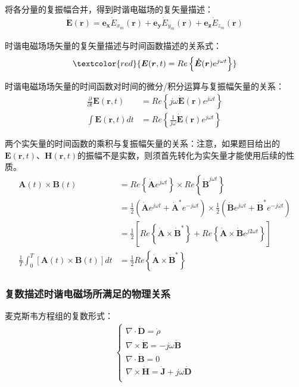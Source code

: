 \documentclass[withoutpreface,bwprint]{cumcmthesis} %
\begin{document}
将各分量的复振幅合并，得到时谐电磁场的复矢量描述：
\begin{align}
    \boldsymbol{\dot{E}}(\boldsymbol{r}) = \boldsymbol{e_x}\dot{E}_{x_m}(\boldsymbol{r}) + \boldsymbol{e_y}\dot{E}_{y_m}(\boldsymbol{r}) + \boldsymbol{e_z}\dot{E}_{z_m}(\boldsymbol{r})
\end{align}

时谐电磁场场矢量的复矢量描述与时间函数描述的关系式：
\begin{align}
    \textcolor{red}{
        \boldsymbol{E}(\boldsymbol{r}, t) = Re\left\{\boldsymbol{\dot{E}}(\boldsymbol{r})e^{j\omega t}\right\}
    }
\end{align}

时谐电磁场场矢量的时间函数对时间的微分/积分运算与复振幅矢量的关系：
\begin{align}
    \frac{\partial}{\partial t}\boldsymbol{E}(\boldsymbol{r}, t) &= Re\left\{j\omega \boldsymbol{\dot{E}}(\boldsymbol{r})e^{j\omega t}\right\}\\
    \int \boldsymbol{E}(\boldsymbol{r}, t)dt &= Re\left\{\frac{1}{j\omega} \boldsymbol{\dot{E}}(\boldsymbol{r})e^{j\omega t}\right\}
\end{align}

两个实矢量的时间函数的乘积与复振幅矢量的关系：注意，如果题目给出的$\boldsymbol{E}(\boldsymbol{r}, t)$、$\boldsymbol{H}(\boldsymbol{r}, t)$的振幅不是实数，则须首先转化为实矢量才能使用后续的性质。
\begin{align}
    \boldsymbol{A}(t)\times \boldsymbol{B}(t) &= Re\left\{\boldsymbol{\dot{A}}e^{j\omega t}\right\}\times Re\left\{\boldsymbol{\dot{B}}^{j\omega t}\right\}\\
    &= \frac{1}{2}(\boldsymbol{\dot{A}}e^{j\omega t}+\boldsymbol{\dot{A}}^{*}e^{-j\omega t}) \times \frac{1}{2}(\boldsymbol{\dot{B}}e^{j\omega t}+\boldsymbol{\dot{B}}^{*}e^{-j\omega t})\\
    &= \frac{1}{2}\left[Re\left\{\boldsymbol{\dot{A}}\times \boldsymbol{\dot{B}}^{*}\right\} + Re\left\{\boldsymbol{\dot{A}}\times \boldsymbol{\dot{B}}e^{j2\omega t}\right\}\right]\\
    \frac{1}{T}\int_0^T [\boldsymbol{A}(t)\times \boldsymbol{B}(t)]dt &= \frac{1}{2}Re\left\{\boldsymbol{\dot{A}}\times \boldsymbol{\dot{B}}^{*}\right\}
\end{align}

\subsubsection{复数描述时谐电磁场所满足的物理关系}
麦克斯韦方程组的复数形式：
\begin{align}
    \begin{cases}
    \nabla \cdot \boldsymbol{\dot{D}} = \dot{\rho} \\
    \nabla \times \boldsymbol{\dot{E}} = -j\omega \boldsymbol{\dot{B}} \\
    \nabla \cdot \boldsymbol{\dot{B}} = 0 \\
    \nabla \times \boldsymbol{\dot{H}} = \boldsymbol{\dot{J}} + j\omega \boldsymbol{\dot{D}} \\
    \end{cases}
\end{align}
\end{document}
